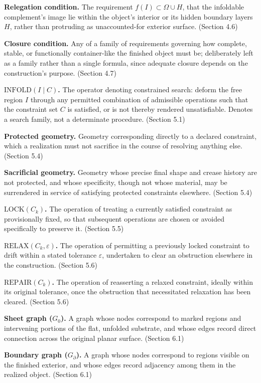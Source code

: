\documentclass[11pt,oneside]{book}
\begin{document}
\textbf{Relegation condition.} The requirement
\(f(I) \subset \Omega \cup H\), that the infoldable complement's image
lie within the object's interior or its hidden boundary layers \(H\),
rather than protruding as unaccounted-for exterior surface. (Section
4.6)

\textbf{Closure condition.} Any of a family of requirements governing
how complete, stable, or functionally container-like the finished object
must be; deliberately left as a family rather than a single formula,
since adequate closure depends on the construction's purpose. (Section
4.7)

\textbf{\(\text{INFOLD}(I \mid C)\).} The operator denoting constrained
search: deform the free region \(I\) through any permitted combination
of admissible operations such that the constraint set \(C\) is
satisfied, or is not thereby rendered unsatisfiable. Denotes a search
family, not a determinate procedure. (Section 5.1)

\textbf{Protected geometry.} Geometry corresponding directly to a
declared constraint, which a realization must not sacrifice in the
course of resolving anything else. (Section 5.4)

\textbf{Sacrificial geometry.} Geometry whose precise final shape and
crease history are not protected, and whose specificity, though not
whose material, may be surrendered in service of satisfying protected
constraints elsewhere. (Section 5.4)

\textbf{\(\text{LOCK}(C_k)\).} The operation of treating a currently
satisfied constraint as provisionally fixed, so that subsequent
operations are chosen or avoided specifically to preserve it. (Section
5.5)

\textbf{\(\text{RELAX}(C_k, \varepsilon)\).} The operation of permitting
a previously locked constraint to drift within a stated tolerance
\(\varepsilon\), undertaken to clear an obstruction elsewhere in the
construction. (Section 5.6)

\textbf{\(\text{REPAIR}(C_k)\).} The operation of reasserting a relaxed
constraint, ideally within its original tolerance, once the obstruction
that necessitated relaxation has been cleared. (Section 5.6)

\textbf{Sheet graph (\(G_0\)).} A graph whose nodes correspond to marked
regions and intervening portions of the flat, unfolded substrate, and
whose edges record direct connection across the original planar surface.
(Section 6.1)

\textbf{Boundary graph (\(G_\partial\)).} A graph whose nodes correspond
to regions visible on the finished exterior, and whose edges record
adjacency among them in the realized object. (Section 6.1)
\end{document}
